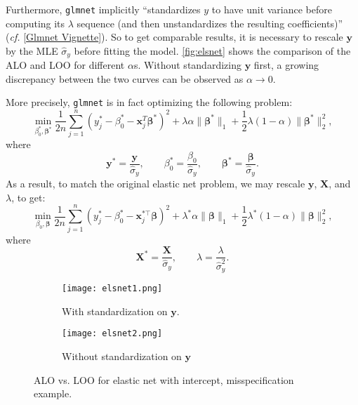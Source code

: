 \documentclass[11pt]{article}
\newcommand{\by}{\bm{y}}
\newcommand{\bX}{\bm{X}}
\newcommand{\bbeta}{\bm{\beta}}
\begin{document}
Furthermore, \verb|glmnet| implicitly ``standardizes \(y\) to have unit variance before computing its \(\lambda\) sequence (and then unstandardizes the resulting coefficients)'' (\emph{cf.} [\href{https://web.stanford.edu/~hastie/glmnet/glmnet_alpha.html}{Glmnet Vignette}]). So to get comparable results, it is necessary to rescale \(\by\) by the MLE \(\hat{\sigma}_y\) before fitting the model. \autoref{fig:elsnet} shows the comparison of the ALO and LOO for different \(\alpha\)s. Without standardizing \(\by\) first, a growing discrepancy between the two curves can be observed as \(\alpha\to0\).

More precisely, \verb|glmnet| is in fact optimizing the following problem: 
	\begin{equation}
		\min_{\beta_0^\ast,\bm{\beta}^\ast}\frac{1}{2n}\sum_{j=1}^{n}\left(y_j^\ast-\beta_0^\ast-\bm{x}_j^T\bm{\beta}^\ast\right)^2+\lambda\alpha\|\bm{\beta}^\ast\|_1+\frac{1}{2}\lambda(1-\alpha)\|\bm{\beta}^\ast\|_2^2,
	\end{equation}
where \[\by^\ast=\frac{\by}{\hat{\sigma}_y},\qquad\beta_0^\ast=\frac{\beta_0}{\hat{\sigma}_y},\qquad\bbeta^\ast=\frac{\bbeta}{\hat{\sigma}_y}.\] As a result, to match the original elastic net problem, we may rescale \(\by\), \(\bX\), and \(\lambda\), to get:
\begin{equation}
	\min_{\beta_0,\bm{\beta}}\frac{1}{2n}\sum_{j=1}^{n}\left(y_j^\ast-\beta_0^\ast-\bm{x}_j^{\ast\top}\bm{\beta}\right)^2+\lambda^\ast\alpha\|\bm{\beta}\|_1+\frac{1}{2}\lambda^\ast(1-\alpha)\|\bm{\beta}\|_2^2,
\end{equation} 
where \[\bX^\ast=\frac{\bX}{\hat{\sigma}_y},\qquad\lambda=\frac{\lambda}{\hat{\sigma}_y^2}.\]
	\begin{figure}[!htbp]
	\centering
	\begin{subfigure}[b]{\textwidth}
		\texttt{[image: elsnet1.png]}
		\caption{With standardization on \(\by\).}
	\end{subfigure}
	\begin{subfigure}[b]{\textwidth}
		\texttt{[image: elsnet2.png]}
		\caption{Without standardization on \(\by\)}
	\end{subfigure}
	\caption{ALO vs. LOO for elastic net with intercept, misspecification example.\label{fig:elsnet}}
	\end{figure}
\end{document}
